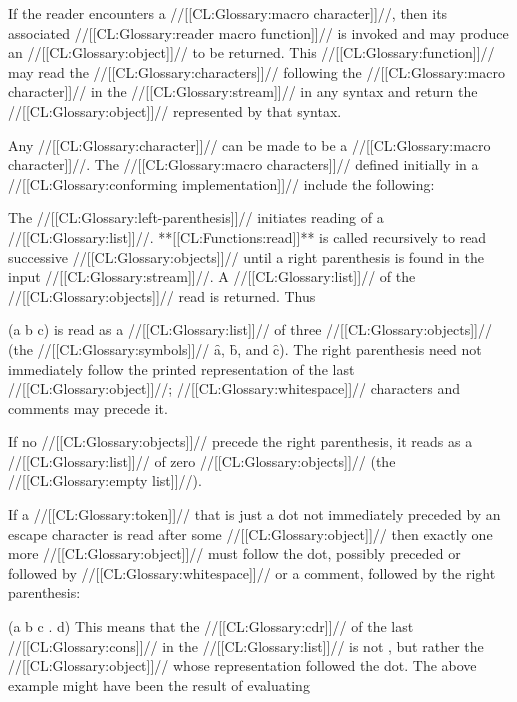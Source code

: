 

If the reader encounters a //[[CL:Glossary:macro character]]//, then its associated //[[CL:Glossary:reader macro function]]//  is invoked and may produce an //[[CL:Glossary:object]]// to be returned. This //[[CL:Glossary:function]]// may read the //[[CL:Glossary:characters]]//  following the //[[CL:Glossary:macro character]]// in the //[[CL:Glossary:stream]]//  in any syntax and return the //[[CL:Glossary:object]]// represented by that syntax.

Any //[[CL:Glossary:character]]// can be made to be a //[[CL:Glossary:macro character]]//. The //[[CL:Glossary:macro characters]]// defined initially in a //[[CL:Glossary:conforming implementation]]// include the following:

 \idxcode{(}

The //[[CL:Glossary:left-parenthesis]]// initiates reading of a //[[CL:Glossary:list]]//. **[[CL:Functions:read]]** is called recursively to read successive //[[CL:Glossary:objects]]// until a right parenthesis is found in the input //[[CL:Glossary:stream]]//. A //[[CL:Glossary:list]]// of the //[[CL:Glossary:objects]]// read is returned.  Thus

\code
 (a b c) \endcode is read as a //[[CL:Glossary:list]]// of three //[[CL:Glossary:objects]]// (the //[[CL:Glossary:symbols]]// \f{a}, \f{b}, and \f{c}). The right parenthesis need not immediately follow the printed representation of the last //[[CL:Glossary:object]]//; //[[CL:Glossary:whitespace]]//                               characters and comments may precede it.

If no //[[CL:Glossary:objects]]// precede the right parenthesis,  it reads as a //[[CL:Glossary:list]]// of zero //[[CL:Glossary:objects]]//  (the //[[CL:Glossary:empty list]]//).

If a //[[CL:Glossary:token]]// that is just a dot not immediately preceded by an escape character is read after some //[[CL:Glossary:object]]// then exactly one more //[[CL:Glossary:object]]// must follow the dot, possibly preceded or followed by //[[CL:Glossary:whitespace]]// or a comment, followed by the right parenthesis:

\code
 (a b c . d) \endcode This means that the //[[CL:Glossary:cdr]]// of the last //[[CL:Glossary:cons]]// in the  //[[CL:Glossary:list]]// is not \nil, but rather the //[[CL:Glossary:object]]// whose representation followed the dot. The above example might have been the result of evaluating

